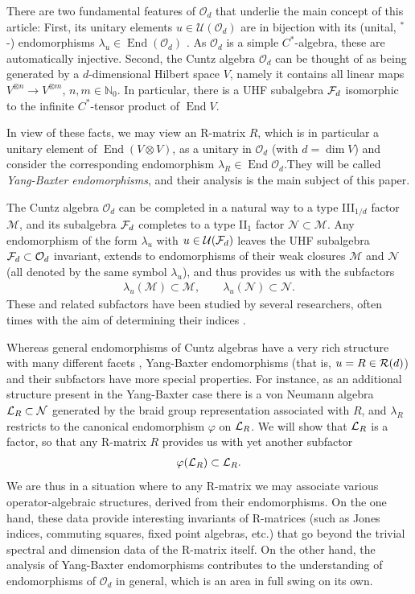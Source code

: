 \documentclass[12pt,a4paper]{amsart}
\numberwithin{equation}{section}
\theoremstyle{remark}
\def\End{\operatorname{End}}
\def\dim{\operatorname{dim}}
\newcommand{\ot}{\otimes}
\newcommand{\tp}[1]{^{\otimes #1}}    %
\newcommand{\Nl}{\mathbb{N}}
\newcommand{\la}{\lambda}
\newcommand{\CM}[0]{\mathcal{M}} \newcommand{\CN}[0]{\mathcal{N}}
\newcommand{\CO}[0]{\mathcal{O}} \newcommand{\CP}[0]{\mathcal{P}}
\newcommand{\CU}[0]{\mathcal{U}} \newcommand{\CV}[0]{\mathcal{V}}
\begin{document}
There are two fundamental features of $\CO_d$ that underlie the main concept of this article: First, its unitary elements $u\in\CU(\CO_d)$ are in bijection with its (unital, ${}^*$-) endomorphisms $\la_u\in\End(\CO_d)$ \cite{Cuntz:1980}. As $\CO_d$ is a simple $C^*$-algebra, these are automatically injective. Second, the Cuntz algebra $\CO_d$ can be thought of as being generated by a $d$-dimensional Hilbert space $V$, namely it contains all linear maps $V\tp{n}\to V\tp{m}$, $n,m\in\Nl_0$. In particular, there is a UHF subalgebra $\mathcal{F}_d$ isomorphic to the infinite $C^*$-tensor product of $\End V$. 

In view of these facts, we may view an R-matrix $R$, which is in particular a unitary element of $\End (V\ot V)$, as a unitary in $\CO_d$ (with $d=\dim V$) and consider the corresponding endomorphism $\la_R\in\End\CO_d$.They will be called {\em Yang-Baxter endomorphisms}, and their analysis is the main subject of this paper.

The Cuntz algebra $\CO_d$ can be completed in a natural way to a type III$_{1/d}$ factor $\CM$, and its subalgebra $\mathcal{F}_d$ completes to a type II$_1$ factor $\CN\subset\CM$. Any endomorphism of the form $\la_u$ with $u\in\CU(\CF_d)$ leaves the UHF subalgebra $\CF_d\subset\CO_d$ invariant, extends to endomorphisms of their weak closures $\CM$ and $\CN$ (all denoted by the same symbol $\la_u$), and thus provides us with the subfactors
\begin{align}\label{eq:subfactor1-intro}
	\la_u(\CM)\subset\CM,\qquad 
	\la_u(\CN)\subset\CN.
\end{align}
These and related subfactors have been studied by several researchers, often times with the aim of determining their indices \cite{ContiPinzari:1996,Akemann:1997,Izumi:1993}.

Whereas general endomorphisms of Cuntz algebras have a very rich structure with many different facets \cite{ContiRordamSzymanski:2010,ContiSzymanski:2011}, Yang-Baxter endomorphisms (that is, $u=R\in\mathcal{R}(d)$) and their subfactors have more special properties. For instance, as an additional structure present in the Yang-Baxter case there is a von Neumann algebra $\CL_R\subset\CN$ generated by the braid group representation associated with $R$, and $\la_R$ restricts to the canonical endomorphism $\varphi$ on $\mathcal{L}_R$. We will show that $\mathcal{L}_R$ is a factor, so that any R-matrix $R$ provides us with yet another subfactor
\begin{align}\label{eq:subfactor2-intro}
    \varphi(\mathcal{L}_R)\subset\mathcal{L}_R.
\end{align}
We are thus in a situation where to any R-matrix we may associate various operator-algebraic structures, derived from their endomorphisms. On the one hand, these data provide interesting invariants of R-matrices (such as Jones indices, commuting squares, fixed point algebras, etc.) that go beyond the trivial spectral and dimension data of the R-matrix itself. On the other hand, the analysis of Yang-Baxter endomorphisms contributes to the understanding of endomorphisms of $\CO_d$ in general, which is an area in full swing on its own.
\end{document}
